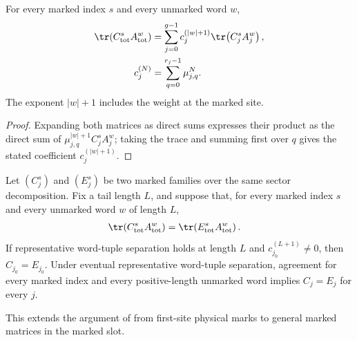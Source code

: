 \begin{lemma}
    \label{lem:marked_representative_trace_expansion}
    \leanok
    For every marked index $s$ and every unmarked word $w$,
    \begin{align}
        \tr\!\left(C_{\mathrm{tot}}^s A_{\mathrm{tot}}^w\right)
         & =\sum_{j=0}^{g-1}c_j^{(|w|+1)}
        \tr\!\left(C_j^s A_j^w\right),
        \label{eq:mpdo_marked_trace_expansion} \\
        c_j^{(N)}
         & =\sum_{q=0}^{r_j-1}\mu_{j,q}^N.
        \notag
    \end{align}
    The exponent $|w|+1$ includes the weight at the marked site.
\end{lemma}

\begin{proof}
    \leanok
    Expanding both matrices as direct sums expresses their product as the
    direct sum of $\mu_{j,q}^{|w|+1}C_j^sA_j^w$; taking the trace and summing
    first over $q$ gives the stated coefficient $c_j^{(|w|+1)}$.
\end{proof}

\begin{lemma}
    \label{thm:representative_grouped_marked_separation}
    \leanok
    Let $(C_j^s)$ and $(E_j^s)$ be two marked families over the same sector
    decomposition. Fix a tail length $L$, and suppose that, for every marked
    index $s$ and every unmarked word $w$ of length $L$,
    \begin{align}
        \tr\!\left(C_{\mathrm{tot}}^s A_{\mathrm{tot}}^w\right)
         & =\tr\!\left(E_{\mathrm{tot}}^s A_{\mathrm{tot}}^w\right).
        \notag
    \end{align}
    If representative word-tuple separation holds at length $L$ and
    $c_{j_0}^{(L+1)}\neq0$, then $C_{j_0}=E_{j_0}$. Under eventual
    representative word-tuple separation, agreement for every marked index
    and every positive-length unmarked word implies $C_j=E_j$ for every $j$.

    This extends the argument of \cite[Appendix~C.3, lines~1848--1858]{Cirac2016MPDO_arXiv}
    from first-site physical marks to general marked matrices in the marked slot.
\end{lemma}

